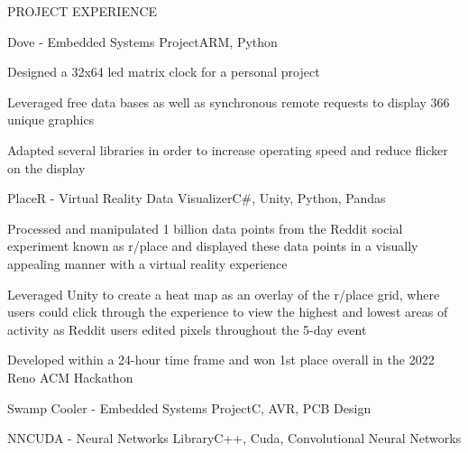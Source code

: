 \documentclass{resume} %
\begin{document}

\begin{rSection}{PROJECT EXPERIENCE}

	\begin{rSubsection}{Dove - Embedded Systems Project}{ARM, Python}{}{}
		\item Designed a 32x64 led matrix clock for a personal project
		\item Leveraged free data bases as well as synchronous remote requests to display 366 unique graphics
		\item Adapted several libraries in order to increase operating speed and reduce flicker on the display
	\end{rSubsection}

	\begin{rSubsection}{PlaceR - Virtual Reality Data Visualizer}{C\#, Unity, Python, Pandas}{}{}
		\item Processed and manipulated 1 billion data points from the Reddit social experiment known as r/place and displayed
		these data points in a visually appealing manner with a virtual reality experience
		\item Leveraged Unity to create a heat map as an overlay of the r/place grid, where users could click through the 
		experience to view the highest and lowest areas of activity as Reddit users edited pixels throughout the 5-day event
		\item Developed within a 24-hour time frame and won 1st place overall in the 2022 Reno ACM Hackathon
	\end{rSubsection}

	\begin{emptyrSubsection}{Swamp Cooler - Embedded Systems Project}{C, AVR, PCB Design}{}{}
	\end{emptyrSubsection}

	\begin{emptyrSubsection}{NNCUDA - Neural Networks Library}{C++, Cuda, Convolutional Neural Networks}{}{}
	\end{emptyrSubsection}

\end{rSection}

\end{document}
